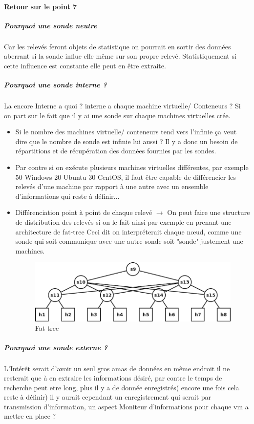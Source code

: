 \documentclass[french]{article}
\begin{document}
\paragraph{Retour sur le point 7 } 
\subparagraph{Pourquoi une sonde neutre}
Car les relevés feront objets de statistique on pourrait en sortir des données aberrant si la sonde influe elle même sur son propre relevé. Statistiquement si cette influence est constante elle peut en être extraite. 
\subparagraph{Pourquoi une sonde interne ?}
La encore Interne a quoi ? interne a chaque machine virtuelle/ Conteneurs ?
Si on part sur le fait que il y ai une sonde sur chaque machines virtuelles crée. 
\begin{itemize}
	\item Si le nombre des machines virtuelle/ conteneurs tend vers l'infinie ça veut dire que le nombre de sonde est infinie lui aussi ? Il y a donc un besoin de répartitions et de récupération des données fournies par les sondes.
	\item Par contre si on exécute plusieurs machines virtuelles différentes, par exemple  50 Windows 20 Ubuntu 30 CentOS, il faut être capable de différencier les relevés d'une machine par rapport à une autre avec un ensemble d'informations qui reste à définir...
	\item Différenciation point à point de chaque relevé $\rightarrow$ On peut faire une structure de distribution des relevés si on le fait ainsi par exemple en prenant une architecture de fat-tree
Ceci dit on interpréterait chaque nœud, comme une sonde qui soit communique avec une autre sonde soit "sonde" justement une machines.
\begin{figure}[!h]
\centering
\caption{Fat tree}
	\includegraphics[scale=0.5]{fat.png}
\end{figure}
\end{itemize}
\subparagraph{Pourquoi une sonde externe  ?}
L’Intérêt serait d'avoir un seul gros amas de données en même endroit il ne resterait que à	en extraire les informations désiré, par contre le temps de recherche peut etre long, plus il y a de donnée enregistrés( encore une fois cela reste à définir) il y aurait cependant un enregistrement qui serait par transmission d'information, un aspect Moniteur d'informations pour chaque vm a mettre en place ? 
\end{document}
